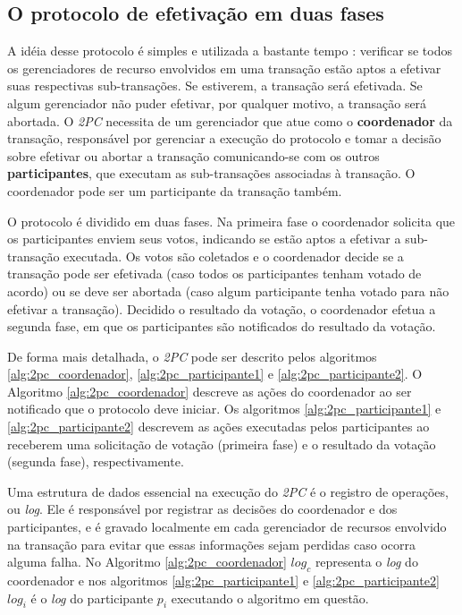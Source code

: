 \documentclass[11pt,twoside,a4paper]{book}
\begin{document}
\subsection{O protocolo de efetivação em duas fases}
\label{subsec:2pc}
A idéia desse protocolo é simples e utilizada a bastante tempo \cite{2pc}: verificar se todos os gerenciadores de recurso envolvidos em uma transação estão aptos a efetivar suas respectivas sub-transações. Se estiverem, a transação será efetivada. Se algum gerenciador não puder efetivar, por qualquer motivo, a transação será abortada. O \emph{2PC} necessita de um gerenciador que atue como o \textbf{coordenador} da transação, responsável por gerenciar a execução do protocolo e tomar a decisão sobre efetivar ou abortar a transação comunicando-se com os outros \textbf{participantes}, que executam as sub-transações associadas à transação. O coordenador pode ser um participante da transação também.

O protocolo é dividido em duas fases. Na primeira fase o coordenador solicita que os participantes enviem seus votos, indicando se estão aptos a efetivar a sub-transação executada. Os votos são coletados e o coordenador decide se a transação pode ser efetivada (caso todos os participantes tenham votado de acordo) ou se deve ser abortada (caso algum participante tenha votado para não efetivar a transação). Decidido o resultado da votação, o coordenador efetua a segunda fase, em que os participantes são notificados do resultado da votação. 

De forma mais detalhada, o \emph{2PC} pode ser descrito pelos algoritmos \ref{alg:2pc_coordenador}, \ref{alg:2pc_participante1} e  \ref{alg:2pc_participante2}. O Algoritmo \ref{alg:2pc_coordenador} descreve as ações do coordenador ao ser notificado que o protocolo deve  iniciar. Os algoritmos \ref{alg:2pc_participante1} e \ref{alg:2pc_participante2} descrevem as ações executadas pelos participantes ao receberem uma solicitação de votação (primeira fase) e o resultado da votação (segunda fase), respectivamente. 

Uma estrutura de dados essencial na execução do \emph{2PC} é o registro de operações, ou \emph{log}. Ele é responsável por registrar as decisões do coordenador e dos participantes, e é gravado localmente em cada gerenciador de recursos envolvido na transação para evitar que essas informações sejam perdidas caso ocorra alguma falha. No Algoritmo \ref{alg:2pc_coordenador} $log_c$ representa o \emph{log} do coordenador e nos algoritmos \ref{alg:2pc_participante1} e \ref{alg:2pc_participante2} $log_i$ é o \emph{log} do participante $p_i$ executando o algoritmo em questão.
\end{document}

